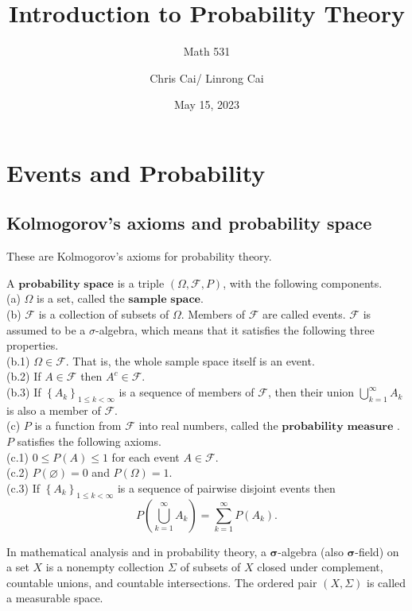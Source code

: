\documentclass[11pt]{elegantbook}
\title{Introduction to Probability Theory}
\subtitle{Math 531}
\author{Chris Cai/ Linrong Cai}
\institute{University of Wisconisn Madison}
\date{May 15, 2023}
\begin{document}
\maketitle

\frontmatter
\tableofcontents

\mainmatter

\chapter{Events and Probability}

\section{Kolmogorov's axioms and probability space}

These are Kolmogorov's axioms for probability theory.
\begin{definition}
A $\textbf{probability space}$ is a triple $(\Omega, \mathcal{F}, P)$, with the following components. \\
(a) $\Omega$ is a set, called the $\textbf{sample space}$. \\ 
(b) $\mathcal{F}$ is a collection of subsets of $\Omega$. Members of $\mathcal{F}$ are called events. $\mathcal{F}$ is assumed to be a $\sigma$-algebra, which means that it satisfies the following three properties.\\
(b.1) $\Omega \in \mathcal{F}$. That is, the whole sample space itself is an event.\\
(b.2) If $A \in \mathcal{F}$ then $A^c \in \mathcal{F}$.\\
(b.3) If $\left\{A_k\right\}_{1 \leq k<\infty}$ is a sequence of members of $\mathcal{F}$, then their union $\bigcup_{k=1}^{\infty} A_k$ is also a member of $\mathcal{F}$.\\
(c) $P$ is a function from $\mathcal{F}$ into real numbers, called the $\textbf{probability measure}$ . $P$ satisfies the following axioms.\\
(c.1) $0 \leq P(A) \leq 1$ for each event $A \in \mathcal{F}$.\\
(c.2) $P(\varnothing)=0$ and $P(\Omega)=1$.\\
(c.3) If $\left\{A_k\right\}_{1 \leq k<\infty}$ is a sequence of pairwise disjoint events then
$$
P\left(\bigcup_{k=1}^{\infty} A_k\right)=\sum_{k=1}^{\infty} P\left(A_k\right) .
$$
\end{definition}

\begin{note}
    In mathematical analysis and in probability theory, a $\boldsymbol{\sigma}$-algebra (also $\boldsymbol{\sigma}$-field) on a set $X$ is a nonempty collection $\Sigma$ of subsets of $X$ closed under complement, countable unions, and countable intersections. The ordered pair $(X, \Sigma)$ is called a measurable space.
\end{note}
\end{document}
